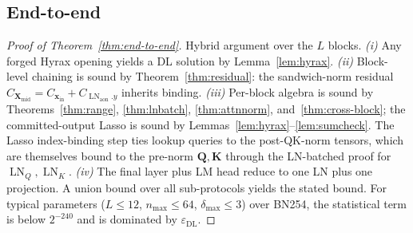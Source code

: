 \documentclass[letterpaper,twocolumn,10pt]{article}
\theoremstyle{remark}
\theoremstyle{definition}
\newcommand{\bx}{\mathbf{x}}
\newcommand{\bX}{\mathbf{X}}
\newcommand{\bQ}{\mathbf{Q}}
\newcommand{\bK}{\mathbf{K}}
\DeclareMathOperator{\LN}{LN}
\begin{document}
\subsection{End-to-end}
\begin{proof}[Proof of Theorem~\ref{thm:end-to-end}]
Hybrid argument over the $L$ blocks. \emph{(i)} Any forged Hyrax
opening yields a DL solution by Lemma~\ref{lem:hyrax}. \emph{(ii)}
Block-level chaining is sound by Theorem~\ref{thm:residual}: the
sandwich-norm residual
$C_{\bX_{\mathrm{mid}}}\!=\!C_{\bx_{\mathrm{in}}}\!+\!C_{\LN_{\mathrm{aon}}.y}$
inherits binding. \emph{(iii)} Per-block algebra is sound by
Theorems~\ref{thm:range}, \ref{thm:lnbatch}, \ref{thm:attnnorm},
and~\ref{thm:cross-block}; the committed-output Lasso is sound by
Lemmas~\ref{lem:hyrax}--\ref{lem:sumcheck}. The Lasso index-binding
step ties lookup queries to the post-QK-norm tensors, which are
themselves bound to the pre-norm $\bQ,\bK$ through the LN-batched
proof for $\LN_Q,\LN_K$. \emph{(iv)} The final layer plus LM head
reduce to one LN plus one projection. A union bound over all
sub-protocols yields the stated bound. For typical parameters
($L\!\le\!12$, $n_{\max}\!\le\!64$, $\delta_{\max}\!\le\!3$) over
BN254, the statistical term is below $2^{-240}$ and is dominated by
$\varepsilon_{\mathrm{DL}}$.
\end{proof}
\end{document}
